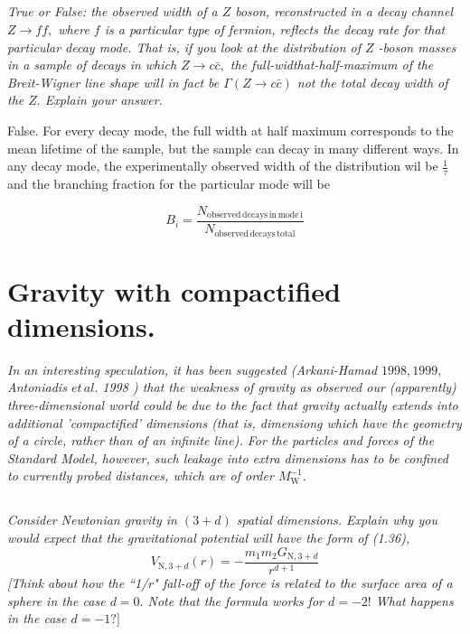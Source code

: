\documentclass{article}
\begin{document}
\subsection{}
\textit{True or False: the observed width of a $Z$ boson, reconstructed in a decay channel $Z \rightarrow f f,$ where $f$ is a particular type of fermion, reflects the decay rate for that particular decay mode. That is, if you look at the distribution of $Z$ -boson masses in a sample of decays in which $Z \rightarrow c \bar{c},$ the full-widthat-half-maximum of the Breit-Wigner line shape will in fact be $\Gamma(Z \rightarrow c \bar{c})$ not the total decay width of the $Z .$ Explain your answer.}

False. For every decay mode, the full width at half maximum corresponds to the mean lifetime of the sample, but the sample can decay in many different ways. In any decay mode, the experimentally observed width of the distribution wil be $\frac{1}{\tau}$ and the branching fraction for the particular mode will be 

$$ B_i = \frac{N_\mathrm{observed\, decays\, in\, mode\, i}}{N_\mathrm{observed\, decays\, total}}$$

\newpage

\section{Gravity with compactified dimensions.}
\textit{In an interesting speculation, it has been suggested (Arkani-Hamad $1998,1999,$ Antoniadis $e t\, al.$ 1998 ) that the weakness of gravity as observed our (apparently) three-dimensional world could be due to the fact that gravity actually extends into additional 'compactified' dimensions (that is, dimensiong which have the geometry of a circle, rather than of an infinite line). For the particles and forces of the Standard Model, however, such leakage into extra dimensions has to be confined to currently probed distances, which are of order $M_{\mathrm{W}}^{-1}.$}


\subsection{}
\textit{Consider Newtonian gravity in $(3+d)$ spatial dimensions. Explain why you would expect that the gravitational potential will have the form of (1.36), 
$$
V_{\mathrm{N}, 3+d}(r)=-\frac{m_{1} m_{2} G_{\mathrm{N}, 3+d}}{r^{d+1}}
$$
[Think about how the ``1/r" fall-off of the force is related to the surface area of a sphere in the case $d=0 .$ Note that the formula works for $d=-2 !$ What happens in the case $d=-1 ?]$}
\end{document}
